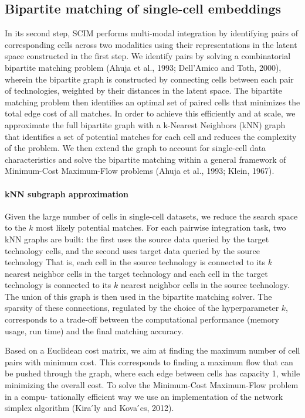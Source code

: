 \subsection{Bipartite matching of single-cell embeddings}
In its second step, SCIM performs multi-modal integration by identifying pairs of corresponding cells across two modalities using their representations in the latent space constructed in the first step.
We identify pairs by solving a combinatorial bipartite matching problem (Ahuja et al., 1993; Dell’Amico and Toth, 2000), wherein the bipartite graph is constructed by connecting cells between each pair of technologies, weighted by their distances in the latent space.
The bipartite matching problem then identifies an optimal set of paired cells that minimizes the total edge cost of all matches.
In order to achieve this efficiently and at scale, we approximate the full bipartite graph with a k-Nearest Neighbors (kNN) graph that identifies a set of potential matches for each cell and reduces the complexity of the problem.
We then extend the graph to account for single-cell data characteristics and solve the bipartite matching within a general framework of Minimum-Cost Maximum-Flow problems (Ahuja et al., 1993; Klein, 1967).

\paragraph{kNN subgraph approximation}
Given the large number of cells in single-cell datasets, we reduce the search space to the $k$ most likely potential matches.
For each pairwise integration task, two kNN graphs are built: the first uses the source data queried by the target technology cells, and the second uses target data queried by the source technology
That is, each cell in the source technology is connected to its $k$ nearest neighbor cells in the target technology and each cell in the target technology is connected to its $k$ nearest neighbor cells in the source technology.
The union of this graph is then used in the bipartite matching solver.
The sparsity of these connections, regulated by the choice of the hyperparameter $k$, corresponds to a trade-off between the computational performance (memory usage, run time) and the final matching accuracy.

Based on a Euclidean cost matrix, we aim at finding the maximum number of cell pairs with minimum cost.
This corresponds to finding a maximum flow that can be pushed through the graph, where each edge between cells has capacity 1, while minimizing the overall cost.
To solve the Minimum-Cost Maximum-Flow problem in a compu- tationally efficient way we use an implementation of the network simplex algorithm (Kira ́ly and Kova ́cs, 2012).















